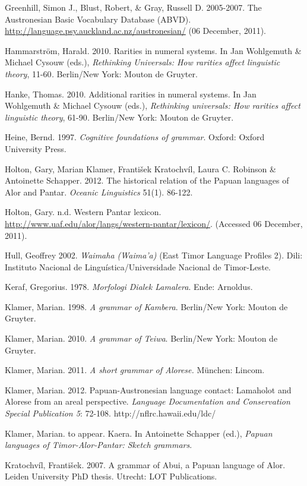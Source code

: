 Greenhill, Simon J., Blust, Robert, \& Gray, Russell D. 2005-2007. The Austronesian Basic Vocabulary Database (ABVD). \url{http://language.psy.auckland.ac.nz/austronesian/} (06 December, 2011).

Hammarstr\"om, Harald. 2010. Rarities in numeral systems. In Jan Wohlgemuth \& Michael Cysouw (eds.), \textit{Rethinking Universals: How rarities affect linguistic theory}, 11-60\textit{. }Berlin/New York: Mouton de Gruyter. 

Hanke, Thomas. 2010. Additional rarities in numeral systems. In Jan Wohlgemuth \& Michael Cysouw (eds.), \textit{Rethinking universals: How rarities affect linguistic theory}, 61-90\textit{. }Berlin/New York: Mouton de Gruyter.

Heine, Bernd. 1997. \textit{Cognitive foundations of grammar}. Oxford: Oxford University Press.

Holton, Gary, Marian Klamer, Franti\v{s}ek Kratochv\'il, Laura C. Robinson \& Antoinette Schapper. 2012. The historical relation of the Papuan languages of Alor and Pantar. \textit{Oceanic Linguistics }51(1). 86-122.

Holton, Gary. n.d. Western Pantar lexicon. \url{http://www.uaf.edu/alor/langs/western-pantar/lexicon/}. (Accessed 06 December, 2011).

Hull, Geoffrey 2002. \textit{Waimaha (Waima{\textquoteright}a) }(East Timor Language Profiles 2). Dili: Instituto Nacional de Lingu\'istica/Universidade Nacional de Timor-Leste.

Keraf, Gregorius. 1978. \textit{Morfologi Dialek Lamalera}. Ende: Arnoldus.

Klamer, Marian. 1998. \textit{A grammar of Kambera}. Berlin/New York: Mouton de Gruyter. 

Klamer, Marian. 2010. \textit{A grammar of Teiwa}. Berlin/New York: Mouton de Gruyter. 

Klamer, Marian. 2011. \textit{A short grammar of Alorese.} M\"unchen: Lincom. 

Klamer, Marian. 2012. Papuan-Austronesian language contact: Lamaholot and Alorese from an areal perspective. \textit{Language Documentation and Conservation Special Publication 5}: 72-108.\textit{ }http://nflrc.hawaii.edu/ldc/

Klamer, Marian. to appear. Kaera. In Antoinette Schapper (ed.), \textit{Papuan languages of Timor-Alor-Pantar: Sketch grammars}.

Kratochv\'il, Franti\v{s}ek. 2007. A grammar of Abui, a Papuan language of Alor. Leiden University PhD thesis. Utrecht: LOT Publications.

